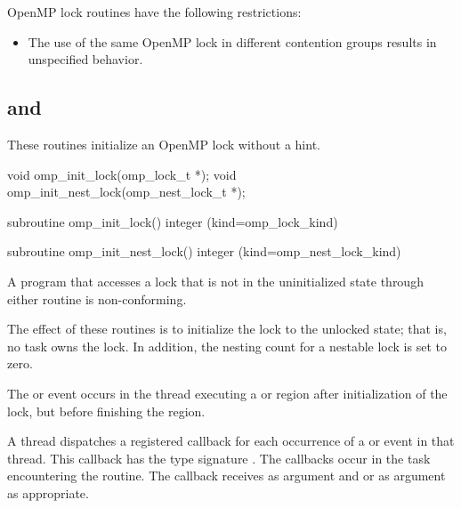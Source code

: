 \restrictions
OpenMP lock routines have the following restrictions:

\begin{itemize}
\item The use of the same OpenMP lock in different contention groups results in 
unspecified behavior. 
\end{itemize}










\subsection{ and }
\label{subsec:omp_init_lock and omp_init_nest_lock}
\summary
These routines initialize an OpenMP lock without a hint.

\format
\ccppspecificstart
\begin{boxedcode}
void omp\_init\_lock(omp\_lock\_t *);
void omp\_init\_nest\_lock(omp\_nest\_lock\_t *);
\end{boxedcode}
\ccppspecificend

\fortranspecificstart
\begin{boxedcode}
subroutine omp\_init\_lock()
integer (kind=omp\_lock\_kind) 

subroutine omp\_init\_nest\_lock()
integer (kind=omp\_nest\_lock\_kind) 
\end{boxedcode}
\fortranspecificend

\constraints
A program that accesses a lock that is not in the uninitialized state through either routine 
is non-conforming.

\effect
The effect of these routines is to initialize the lock to the unlocked state; that is, no task 
owns the lock. In addition, the nesting count for a nestable lock is set to zero.

\events

The  or  event occurs in the thread 
executing a  or  region
after initialization of the lock, but before finishing the region.

\tools

A thread dispatches a registered 
callback for each occurrence of a  or  event 
in that thread.  This callback has the type signature .
The callbacks occur in the task encountering the routine.
The callback receives  as
 argument and
 or 
  as  argument as appropriate.

